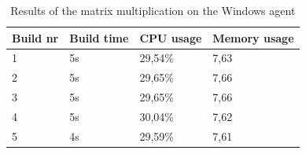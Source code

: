 \begin{table}[H]
\centering
\begin{tabular}{|l|l|l|l|}
\hline
Build nr & Build time & CPU usage & Memory usage \\ \hline
1        & 5s         & 29,54\%   & 7,63        \\ \hline
2        & 5s         & 29,65\%   & 7,66        \\ \hline
3        & 5s         & 29,65\%   & 7,66        \\ \hline
4        & 5s         & 30,04\%   & 7,62        \\ \hline
5        & 4s         & 29,59\%   & 7,61        \\ \hline
\end{tabular}
\caption{Results of the matrix multiplication on the Windows agent}
\end{table}
